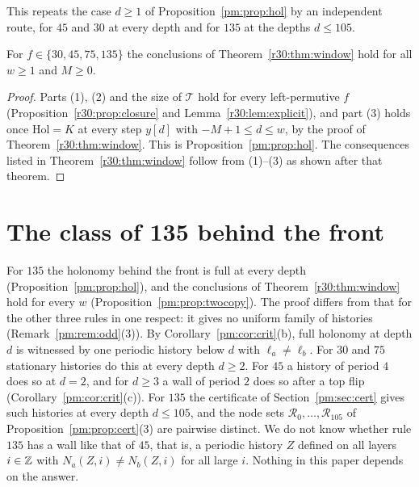 This repeats the case $d\ge1$ of Proposition~\ref{pm:prop:hol} by an independent route, for $45$ and $30$ at every depth and for $135$ at the depths $d\le105$.

\begin{proposition}\label{pm:prop:twocopy}
For $f\in\{30,45,75,135\}$ the conclusions of Theorem~\ref{r30:thm:window} hold for all $w\ge1$ and $M\ge0$.
\end{proposition}

\begin{proof}
Parts (1), (2) and the size of $\mathcal{T}$ hold for every left-permutive $f$ (Proposition~\ref{r30:prop:closure} and Lemma~\ref{r30:lem:explicit}), and part (3) holds once $\mathrm{Hol}=K$ at every step $y[d]$ with $-M+1\le d\le w$, by the proof of Theorem~\ref{r30:thm:window}. This is Proposition~\ref{pm:prop:hol}. The consequences listed in Theorem~\ref{r30:thm:window} follow from (1)--(3) as shown after that theorem.
\end{proof}

\section{The class of 135 behind the front}\label{pm:sec:135}

For $135$ the holonomy behind the front is full at every depth (Proposition~\ref{pm:prop:hol}), and the conclusions of Theorem~\ref{r30:thm:window} hold for every $w$ (Proposition~\ref{pm:prop:twocopy}). The proof differs from that for the other three rules in one respect: it gives no uniform family of histories (Remark~\ref{pm:rem:odd}(3)). By Corollary~\ref{pm:cor:crit}(b), full holonomy at depth $d$ is witnessed by one periodic history below $d$ with $\ell_a\ne\ell_b$. For $30$ and $75$ stationary histories do this at every depth $d\ge2$. For $45$ a history of period $4$ does so at $d=2$, and for $d\ge3$ a wall of period $2$ does so after a top flip (Corollary~\ref{pm:cor:crit}(c)). For $135$ the certificate of Section~\ref{pm:sec:cert} gives such histories at every depth $d\le105$, and the node sets $\mathcal R_0,\dots,\mathcal R_{105}$ of Proposition~\ref{pm:prop:cert}(3) are pairwise distinct. We do not know whether rule $135$ has a wall like that of $45$, that is, a periodic history $Z$ defined on all layers $i\in\mathbb{Z}$ with $N_a(Z,i)\ne N_b(Z,i)$ for all large $i$. Nothing in this paper depends on the answer.
